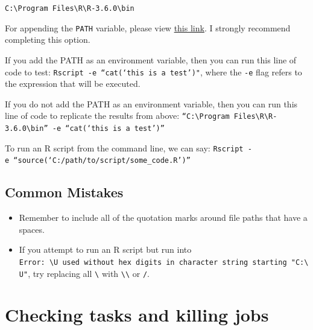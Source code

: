 \documentclass[
]{book}
\providecommand{\tightlist}{%
  \setlength{\itemsep}{0pt}\setlength{\parskip}{0pt}}
\begin{document}
\texttt{C:\textbackslash{}Program\ Files\textbackslash{}R\textbackslash{}R-3.6.0\textbackslash{}bin}

For appending the \texttt{PATH} variable, please view \href{https://www.howtogeek.com/118594/how-to-edit-your-system-path-for-easy-command-line-access/}{this link}. I strongly recommend completing this option.

If you add the PATH as an environment variable, then you can run this line of code to test:
\texttt{Rscript\ -e\ “cat(‘this\ is\ a\ test’)"}, where the \texttt{-e} flag refers to the expression that will be executed.

If you do not add the PATH as an environment variable, then you can run this line of code to replicate the results from above:
\texttt{“C:\textbackslash{}Program\ Files\textbackslash{}R\textbackslash{}R-3.6.0\textbackslash{}bin”\ -e\ “cat(‘this\ is\ a\ test’)”}

To run an R script from the command line, we can say:
\texttt{Rscript\ -e\ “source(‘C:/path/to/script/some\_code.R’)”}

\subsection{Common Mistakes}\label{common-mistakes}

\begin{itemize}
\tightlist
\item
  Remember to include all of the quotation marks around file paths that have a spaces.
\item
  If you attempt to run an R script but run into \texttt{Error:\ \textquotesingle{}\textbackslash{}U\textquotesingle{}\ used\ without\ hex\ digits\ in\ character\ string\ starting\ "\textquotesingle{}C:\textbackslash{}U"}, try replacing all \texttt{\textbackslash{}} with \texttt{\textbackslash{}\textbackslash{}} or \texttt{/}.
\end{itemize}

\section{Checking tasks and killing jobs}\label{checking-tasks-and-killing-jobs}
\end{document}
